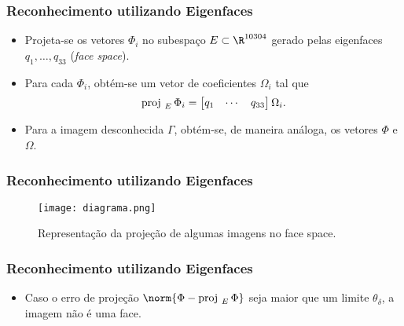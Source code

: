 \documentclass[15pt]{beamer}
\begin{document}
\begin{frame}
    \frametitle{Reconhecimento utilizando Eigenfaces}

    \begin{itemize}
        \item<1-> Projeta-se os vetores \( \Phi_{ i } \) no subespaço \( E \subset \R^{ 10304 } \) gerado pelas eigenfaces \( q_{ 1 }, \dots, q_{ 33 } \) (\emph{face space}).

        \item <2-> Para cada \( \Phi_{ i } \), obtém-se um vetor de coeficientes \( \Omega_{ i } \) tal que \[
                \proj_{ E } \Phi_{ i } =
                \begin{bmatrix}
                    q_{ 1 } & \cdots & q_{ 33 }
                \end{bmatrix}
                \Omega_{ i }
            .\]

        \item<3-> Para a imagem desconhecida \( \Gamma \), obtém-se, de maneira análoga, os vetores \( \Phi \) e \( \Omega \).
    \end{itemize}
\end{frame}

    \begin{frame}
        \frametitle{Reconhecimento utilizando Eigenfaces}

        \begin{center}
            \begin{figure}
                \texttt{[image: diagrama.png]}
                \caption{Representação da projeção de algumas imagens no face space\cite{turk}.}
            \end{figure}
        \end{center}
    
    \end{frame}

\begin{frame}
    \frametitle{Reconhecimento utilizando Eigenfaces}

    \begin{itemize}
        \item<1-> Caso o erro de projeção \( \norm{ \Phi - \proj_{ E } \Phi } \) seja maior que um limite \( \theta_{ \delta } \), a imagem não é uma face.
    \end{itemize}

\end{frame}
\end{document}
